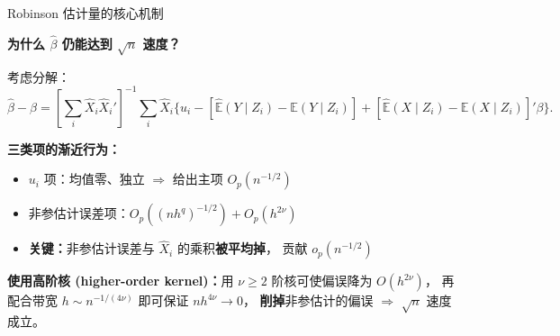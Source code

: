 \documentclass[aspectratio=169, 10pt]{beamer}
\begin{document}
\begin{frame}{Robinson 估计量的核心机制}

  \textbf{为什么 $\hat\beta$ 仍能达到 $\sqrt{n}$ 速度？}

  考虑分解：
  $$\hat\beta - \beta = \left[\sum_i \hat X_i \hat X_i'\right]^{-1}
  \sum_i \hat X_i \bigl\{u_i - [\hat{\mathbb{E}}(Y\mid Z_i) - \mathbb{E}(Y\mid Z_i)]
  + [\hat{\mathbb{E}}(X\mid Z_i) - \mathbb{E}(X\mid Z_i)]'\beta\bigr\}.$$

  \begin{highlightbox}
    \textbf{三类项的渐近行为：}
    \begin{itemize}\setlength{\itemsep}{1pt}
      \item $u_i$ 项：均值零、独立 $\Rightarrow$ 给出主项 $O_p(n^{-1/2})$
      \item 非参估计误差项：$O_p((nh^q)^{-1/2}) + O_p(h^{2\nu})$
      \item \textbf{关键：}非参估计误差与 $\hat X_i$ 的乘积\textbf{被平均掉}，
      贡献 $o_p(n^{-1/2})$
    \end{itemize}
  \end{highlightbox}

  \begin{keybox}
    \textbf{使用高阶核 (higher-order kernel)：}用 $\nu \geq 2$ 阶核可使偏误降为 $O(h^{2\nu})$，
    再配合带宽 $h \sim n^{-1/(4\nu)}$ 即可保证 $nh^{4\nu} \to 0$，
    \textbf{削掉}非参估计的偏误 $\Rightarrow$ $\sqrt{n}$ 速度成立。
  \end{keybox}

  \hypertarget{main-c3}{}
  \hfill{\scriptsize\hyperlink{proof-c3}{}}

\end{frame}
\end{document}
